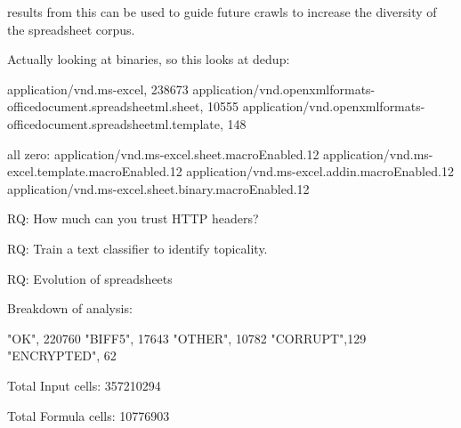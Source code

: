 \documentclass[conference]{IEEEtran}
\begin{document}
results from this can be used to guide future crawls to increase the diversity of the spreadsheet corpus.



Actually looking at binaries, so this looks at dedup:

application/vnd.ms-excel, 238673
application/vnd.openxmlformats-officedocument.spreadsheetml.sheet, 10555
application/vnd.openxmlformats-officedocument.spreadsheetml.template, 148

all zero:
application/vnd.ms-excel.sheet.macroEnabled.12
application/vnd.ms-excel.template.macroEnabled.12
application/vnd.ms-excel.addin.macroEnabled.12
application/vnd.ms-excel.sheet.binary.macroEnabled.12

RQ: How much can you trust HTTP headers?

RQ: Train a text classifier to identify topicality.

RQ: Evolution of spreadsheets



Breakdown of analysis:

"OK", 220760
"BIFF5",  17643 
"OTHER", 10782 
"CORRUPT",129
"ENCRYPTED",  62 

Total Input cells: 357210294

Total Formula cells: 10776903
\end{document}

